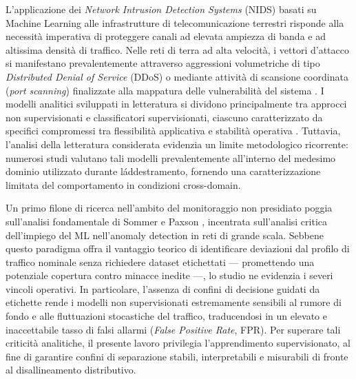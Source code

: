 L'applicazione dei \textit{Network Intrusion Detection Systems} (NIDS) basati su Machine Learning alle infrastrutture di telecomunicazione terrestri risponde alla necessità imperativa di proteggere canali ad elevata ampiezza di banda e ad altissima densità di traffico.
Nelle reti di terra ad alta velocità, i vettori d'attacco si manifestano prevalentemente attraverso aggressioni volumetriche di tipo \textit{Distributed Denial of Service} (DDoS) o mediante attività di scansione coordinata (\textit{port scanning}) finalizzate alla mappatura delle vulnerabilità del sistema \cite{hindy2020, khraisat2019}.
I modelli analitici sviluppati in letteratura si dividono principalmente tra approcci non supervisionati e classificatori supervisionati, ciascuno caratterizzato da specifici compromessi tra flessibilità applicativa e stabilità operativa \cite{kilincer2021}.
Tuttavia, l'analisi della letteratura considerata evidenzia un limite metodologico ricorrente: numerosi studi valutano tali modelli prevalentemente all'interno del medesimo dominio utilizzato durante l\'addestramento, fornendo una caratterizzazione limitata del comportamento in condizioni cross-domain.

Un primo filone di ricerca nell'ambito del monitoraggio non presidiato poggia sull'analisi fondamentale di Sommer e Paxson \cite{sommer2010}, incentrata sull'analisi critica dell'impiego del ML nell'anomaly detection in reti di grande scala. 
Sebbene questo paradigma offra il vantaggio teorico di identificare deviazioni dal profilo di traffico nominale senza richiedere dataset etichettati — promettendo una potenziale copertura contro minacce inedite —, lo studio ne evidenzia i severi vincoli operativi. 
In particolare, l'assenza di confini di decisione guidati da etichette rende i modelli non supervisionati estremamente sensibili al rumore di fondo e alle fluttuazioni stocastiche del traffico, traducendosi in un elevato e inaccettabile tasso di falsi allarmi (\textit{False Positive Rate}, FPR). 
Per superare tali criticità analitiche, il presente lavoro privilegia l'apprendimento supervisionato, al fine di garantire confini di separazione stabili, interpretabili e misurabili di fronte al disallineamento distributivo.

